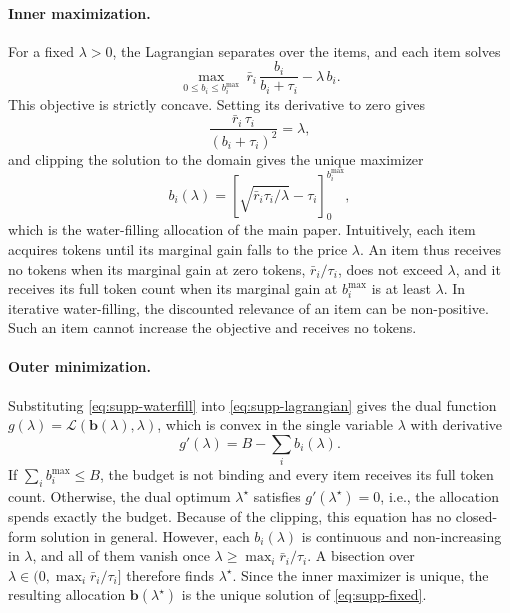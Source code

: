 \paragraph{Inner maximization.}
For a fixed $\lambda>0$, the Lagrangian separates over the items, and each item solves
\begin{equation}
  \max_{0\le b_i\le b_i^{\max}}\ \bar r_i\,\frac{b_i}{b_i+\tau_i}-\lambda\,b_i .
\label{eq:supp-item}
\end{equation}
This objective is strictly concave. Setting its derivative to zero gives
\begin{equation}
  \frac{\bar r_i\,\tau_i}{(b_i+\tau_i)^2}=\lambda ,
\label{eq:supp-stationarity}
\end{equation}
and clipping the solution to the domain gives the unique maximizer
\begin{equation}
  b_i(\lambda)=\left[\sqrt{\bar r_i\tau_i/\lambda}-\tau_i\right]_0^{b_i^{\max}} ,
\label{eq:supp-waterfill}
\end{equation}
which is the water-filling allocation of the main paper. Intuitively, each item acquires tokens until its marginal gain falls to the price $\lambda$. An item thus receives no tokens when its marginal gain at zero tokens, $\bar r_i/\tau_i$, does not exceed $\lambda$, and it receives its full token count when its marginal gain at $b_i^{\max}$ is at least $\lambda$. In iterative water-filling, the discounted relevance of an item can be non-positive. Such an item cannot increase the objective and receives no tokens.

\paragraph{Outer minimization.}
Substituting \cref{eq:supp-waterfill} into \cref{eq:supp-lagrangian} gives the dual function $g(\lambda)=\mathcal L(\mathbf b(\lambda),\lambda)$, which is convex in the single variable $\lambda$ with derivative
\begin{equation}
  g'(\lambda)=B-\sum_i b_i(\lambda) .
\label{eq:supp-dual}
\end{equation}
If $\sum_i b_i^{\max}\le B$, the budget is not binding and every item receives its full token count. Otherwise, the dual optimum $\lambda^\star$ satisfies $g'(\lambda^\star)=0$, i.e., the allocation spends exactly the budget. Because of the clipping, this equation has no closed-form solution in general. However, each $b_i(\lambda)$ is continuous and non-increasing in $\lambda$, and all of them vanish once $\lambda\ge\max_i\bar r_i/\tau_i$. A bisection over $\lambda\in(0,\max_i\bar r_i/\tau_i]$ therefore finds $\lambda^\star$. Since the inner maximizer is unique, the resulting allocation $\mathbf b(\lambda^\star)$ is the unique solution of \cref{eq:supp-fixed}.

